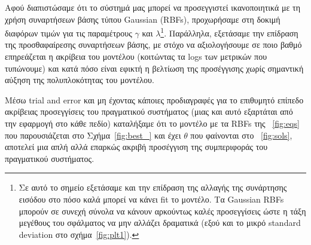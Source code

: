 \documentclass[12pt]{article} %
\numberwithin{equation}{section}  %
\begin{document}
Αφού διαπιστώσαμε ότι το σύστημά μας μπορεί να προσεγγιστεί ικανοποιητικά με τη χρήση συναρτήσεων βάσης τύπου Gaussian (RBFs), 
προχωρήσαμε στη δοκιμή διαφόρων τιμών για τις παραμέτρους $\gamma$ και $\lambda$\footnote{
Σε αυτό το σημείο εξετάσαμε και την επίδραση της αλλαγής της συνάρτησης εισόδου στο πόσο καλά μπορεί να κάνει fit το μοντέλο. 
Τα Gaussian RBFs μπορούν σε συνεχή σύνολα να κάνουν αρκούντως καλές προσεγγίσεις ώστε η τάξη μεγέθους του σφάλματος να μην αλλάζει δραματικά (εξού και το μικρό standard deviation στο σχήμα~\ref{fig:plt1}). 
}. 
Παράλληλα, εξετάσαμε την επίδραση της προσθαφαίρεσης συναρτήσεων βάσης, με στόχο να αξιολογήσουμε σε ποιο βαθμό επηρεάζεται η ακρίβεια του μοντέλου (κοιτώντας τα logs των μετρικών που τυπώνουμε)
και κατά πόσο είναι εφικτή η βελτίωση της προσέγγισης χωρίς σημαντική αύξηση της πολυπλοκότητας του μοντέλου.

Μέσω trial and error\textemdash 
και μη έχοντας κάποιες προδιαγραφές για το επιθυμητό επίπεδο ακρίβειας προσεγγίσεις του πραγματικού συστήματος (μιας και αυτό εξαρτάται από την εφαρμογή στο κάθε πεδίο)\textemdash 
καταλήξαμε ότι το μοντέλο με τα RBFs της ~\ref{fig:eqs} που παρουσιάζεται στο Σχήμα~\ref{fig:best_} 
και έχει $\theta$ που φαίνονται στο ~\ref{fig:sols}, 
αποτελεί μια απλή αλλά επαρκώς ακριβή προσέγγιση της συμπεριφοράς του πραγματικού συστήματος.


\newpage
\end{document}
